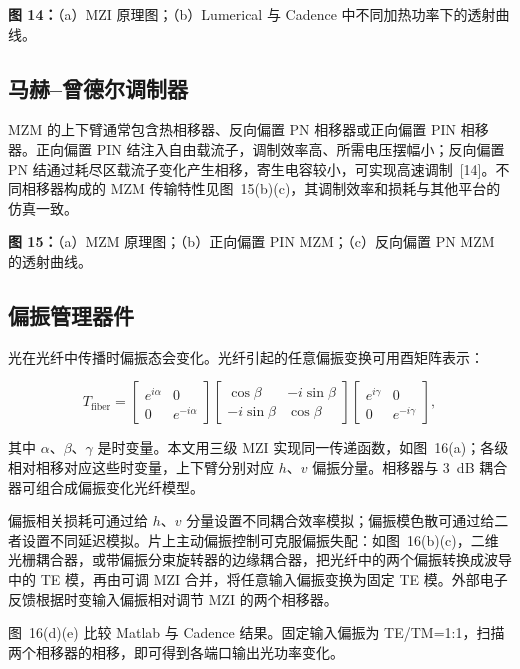 \documentclass[11pt,a4paper]{ctexart}
\begin{document}
\noindent\textbf{图 14：}（a）MZI 原理图；（b）Lumerical 与 Cadence 中不同加热功率下的透射曲线。

\subsection{马赫--曾德尔调制器}

MZM 的上下臂通常包含热相移器、反向偏置 PN 相移器或正向偏置 PIN 相移器。正向偏置 PIN 结注入自由载流子，调制效率高、所需电压摆幅小；反向偏置 PN 结通过耗尽区载流子变化产生相移，寄生电容较小，可实现高速调制~[14]。不同相移器构成的 MZM 传输特性见图~15(b)(c)，其调制效率和损耗与其他平台的仿真一致。

\noindent\textbf{图 15：}（a）MZM 原理图；（b）正向偏置 PIN MZM；（c）反向偏置 PN MZM 的透射曲线。

\subsection{偏振管理器件}

光在光纤中传播时偏振态会变化。光纤引起的任意偏振变换可用酉矩阵表示：

\begin{equation}
T_{\mathrm{fiber}}=
\begin{bmatrix}e^{i\alpha}&0\\0&e^{-i\alpha}\end{bmatrix}
\begin{bmatrix}\cos\beta&-i\sin\beta\\-i\sin\beta&\cos\beta\end{bmatrix}
\begin{bmatrix}e^{i\gamma}&0\\0&e^{-i\gamma}\end{bmatrix},
\tag{27}
\end{equation}

其中 $\alpha$、$\beta$、$\gamma$ 是时变量。本文用三级 MZI 实现同一传递函数，如图~16(a)；各级相对相移对应这些时变量，上下臂分别对应 $h$、$v$ 偏振分量。相移器与 3~dB 耦合器可组合成偏振变化光纤模型。

偏振相关损耗可通过给 $h$、$v$ 分量设置不同耦合效率模拟；偏振模色散可通过给二者设置不同延迟模拟。片上主动偏振控制可克服偏振失配：如图~16(b)(c)，二维光栅耦合器，或带偏振分束旋转器的边缘耦合器，把光纤中的两个偏振转换成波导中的 TE 模，再由可调 MZI 合并，将任意输入偏振变换为固定 TE 模。外部电子反馈根据时变输入偏振相对调节 MZI 的两个相移器。

图~16(d)(e) 比较 Matlab 与 Cadence 结果。固定输入偏振为 TE/TM=1:1，扫描两个相移器的相移，即可得到各端口输出光功率变化。
\end{document}
